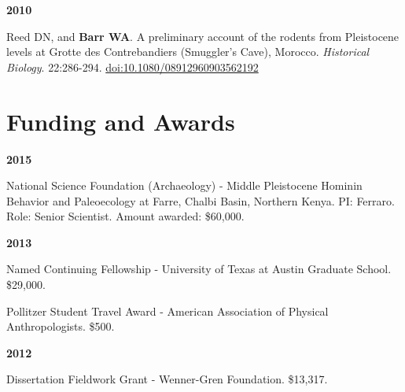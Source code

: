 \documentclass{article}
\begin{document}
\begin{description*}
\item[] {\bfseries 2010}
\item[] Reed DN, and {\bfseries Barr WA}. A preliminary account of the rodents from Pleistocene levels at Grotte des Contrebandiers (Smuggler's Cave),
Morocco. \emph{Historical Biology}. 22:286-294. \href{http://dx.doi.org/10.1080/08912960903562192}{doi:10.1080/08912960903562192}
\end{description*}


\section*{Funding and Awards}



\begin{description*}
\item[] {\bfseries 2015}
\item[] National Science Foundation (Archaeology) - Middle Pleistocene Hominin Behavior and Paleoecology at Farre, Chalbi Basin, Northern Kenya. PI: Ferraro. Role: Senior Scientist.  Amount awarded: \$60,000.
\end{description*}



\begin{description*}
\item[] {\bfseries 2013}
\item[] Named Continuing Fellowship - University of Texas at Austin Graduate School. \$29,000.
\item[] Pollitzer Student Travel Award - American Association of Physical Anthropologists. \$500.
\end{description*}


\begin{description*}
\item[] {\bfseries 2012}
\item[] Dissertation Fieldwork Grant - Wenner-Gren Foundation. \$13,317.
\end{description*}
\end{document}
